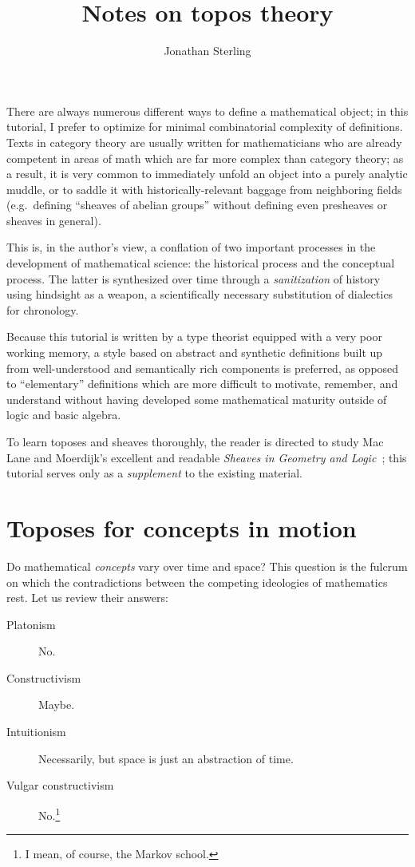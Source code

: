 \documentclass{article}
\title{Notes on topos theory}
\author{Jonathan Sterling}
\affil{Carnegie Mellon University}
\date{}
\begin{document}
\maketitle

There are always numerous different ways to define a mathematical
object; in this tutorial, I prefer to optimize for minimal
combinatorial complexity of definitions.
%
Texts in category theory are usually written for mathematicians who
are already competent in areas of math which are far more complex than
category theory; as a result, it is very common to immediately unfold
an object into a purely analytic muddle, or to saddle it with
historically-relevant baggage from neighboring fields (e.g.\ defining
``sheaves of abelian groups'' without defining even presheaves or
sheaves in general).

This is, in the author's view, a conflation of two important processes
in the development of mathematical science: the historical process and
the conceptual process. The latter is synthesized over time through a
\emph{sanitization} of history using hindsight as a weapon, a
scientifically necessary substitution of dialectics for chronology.

Because this tutorial is written by a type theorist equipped with a
very poor working memory, a style based on abstract and synthetic
definitions built up from well-understood and semantically rich
components is preferred, as opposed to ``elementary'' definitions
which are more difficult to motivate, remember, and understand without
having developed some mathematical maturity outside of logic and basic
algebra.

To learn toposes and sheaves thoroughly, the reader is directed to
study Mac Lane and Moerdijk's excellent and readable \emph{Sheaves in
  Geometry and Logic}~\cite{maclane-moerdijk:1992}; this tutorial
serves only as a \emph{supplement} to the existing material.


\section{Toposes for concepts in motion}

Do mathematical \emph{concepts} vary over time and space? This
question is the fulcrum on which the contradictions between the
competing ideologies of mathematics rest. Let us review their answers:
\begin{description}
\item[Platonism] No.
\item[Constructivism] Maybe.
\item[Intuitionism] Necessarily, but space is just an abstraction of
  time.
\item[Vulgar constructivism] No.\footnote{I mean, of course, the Markov school.}
\end{description}
\end{document}
